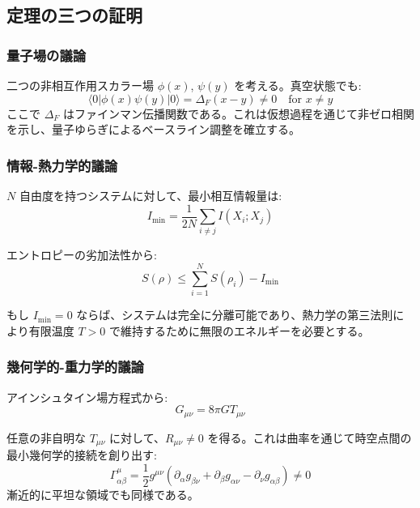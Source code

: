 \documentclass[11pt,a4paper]{article}
\begin{document}
	\subsection{定理の三つの証明}
	
	\subsubsection{量子場の議論}
	
	二つの非相互作用スカラー場 $\phi(x)$, $\psi(y)$ を考える。真空状態でも:
	\begin{equation}
		\langle 0 | \phi(x) \psi(y) | 0 \rangle = \Delta_F(x-y) \neq 0 \quad \text{for } x \neq y
	\end{equation}
	ここで $\Delta_F$ はファインマン伝播関数である。これは仮想過程を通じて非ゼロ相関を示し、量子ゆらぎによるベースライン調整を確立する。
	
	\subsubsection{情報-熱力学的議論}
	
	$N$ 自由度を持つシステムに対して、最小相互情報量は:
	\begin{equation}
		I_{\min} = \frac{1}{2N} \sum_{i \neq j} I(X_i; X_j)
	\end{equation}
	
	エントロピーの劣加法性から:
	\begin{equation}
		S(\rho) \leq \sum_{i=1}^N S(\rho_i) - I_{\min}
	\end{equation}
	
	もし $I_{\min} = 0$ ならば、システムは完全に分離可能であり、熱力学の第三法則により有限温度 $T > 0$ で維持するために無限のエネルギーを必要とする。
	
	\subsubsection{幾何学的-重力学的議論}
	
	アインシュタイン場方程式から:
	\begin{equation}
		G_{\mu\nu} = 8\pi G T_{\mu\nu}
	\end{equation}
	
	任意の非自明な $T_{\mu\nu}$ に対して、$R_{\mu\nu} \neq 0$ を得る。これは曲率を通じて時空点間の最小幾何学的接続を創り出す:
	\begin{equation}
		\Gamma^\mu_{\alpha\beta} = \frac{1}{2} g^{\mu\nu}(\partial_\alpha g_{\beta\nu} + \partial_\beta g_{\alpha\nu} - \partial_\nu g_{\alpha\beta}) \neq 0
	\end{equation}
	漸近的に平坦な領域でも同様である。
	
\end{document}
